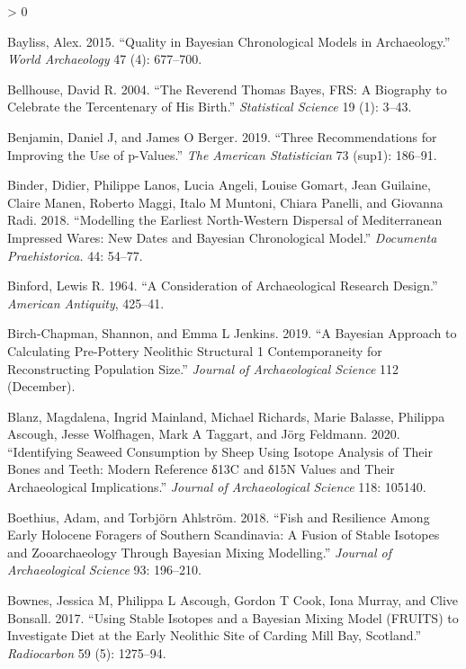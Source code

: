 \documentclass[
]{article}
\newlength{\cslhangindent}
\newenvironment{CSLReferences}[2] %
 {%
  \setlength{\parindent}{0pt}
  \ifodd #1 \everypar{\setlength{\hangindent}{\cslhangindent}}\ignorespaces\fi
  \ifnum #2 > 0
  \setlength{\parskip}{#2\baselineskip}
  \fi
 }%
 {}
\begin{document}
\begin{CSLReferences}{1}{0}
\leavevmode\hypertarget{ref-bayliss_quality_2015}{}%
Bayliss, Alex. 2015. {``Quality in {Bayesian} Chronological Models in
Archaeology.''} \emph{World Archaeology} 47 (4): 677--700.

\leavevmode\hypertarget{ref-bellhouse_reverend_2004}{}%
Bellhouse, David R. 2004. {``The {Reverend} {Thomas} {Bayes}, {FRS}: A
Biography to Celebrate the Tercentenary of His Birth.''}
\emph{Statistical Science} 19 (1): 3--43.

\leavevmode\hypertarget{ref-benjamin_three_2019}{}%
Benjamin, Daniel J, and James O Berger. 2019. {``Three Recommendations
for Improving the Use of p-Values.''} \emph{The American Statistician}
73 (sup1): 186--91.

\leavevmode\hypertarget{ref-binder_modelling_2018}{}%
Binder, Didier, Philippe Lanos, Lucia Angeli, Louise Gomart, Jean
Guilaine, Claire Manen, Roberto Maggi, Italo M Muntoni, Chiara Panelli,
and Giovanna Radi. 2018. {``Modelling the Earliest North-Western
Dispersal of {Mediterranean} {Impressed} {Wares}: New Dates and
{Bayesian} Chronological Model.''} \emph{Documenta Praehistorica.} 44:
54--77.

\leavevmode\hypertarget{ref-binford_consideration_1964}{}%
Binford, Lewis R. 1964. {``A Consideration of Archaeological Research
Design.''} \emph{American Antiquity}, 425--41.

\leavevmode\hypertarget{ref-birch-chapman_bayesian_2019}{}%
Birch-Chapman, Shannon, and Emma L Jenkins. 2019. {``A {Bayesian}
Approach to Calculating {Pre}-{Pottery} {Neolithic} Structural 1
Contemporaneity for Reconstructing Population Size.''} \emph{Journal of
Archaeological Science} 112 (December).

\leavevmode\hypertarget{ref-blanz_identifying_2020}{}%
Blanz, Magdalena, Ingrid Mainland, Michael Richards, Marie Balasse,
Philippa Ascough, Jesse Wolfhagen, Mark A Taggart, and Jörg Feldmann.
2020. {``Identifying Seaweed Consumption by Sheep Using Isotope Analysis
of Their Bones and Teeth: {Modern} Reference δ{13C} and δ{15N} Values
and Their Archaeological Implications.''} \emph{Journal of
Archaeological Science} 118: 105140.

\leavevmode\hypertarget{ref-boethius_fish_2018}{}%
Boethius, Adam, and Torbjörn Ahlström. 2018. {``Fish and Resilience
Among {Early} {Holocene} Foragers of Southern {Scandinavia}: {A} Fusion
of Stable Isotopes and Zooarchaeology Through {Bayesian} Mixing
Modelling.''} \emph{Journal of Archaeological Science} 93: 196--210.

\leavevmode\hypertarget{ref-bownes_using_2017}{}%
Bownes, Jessica M, Philippa L Ascough, Gordon T Cook, Iona Murray, and
Clive Bonsall. 2017. {``Using Stable Isotopes and a {Bayesian} Mixing
Model ({FRUITS}) to Investigate Diet at the Early {Neolithic} Site of
{Carding} {Mill} {Bay}, {Scotland}.''} \emph{Radiocarbon} 59 (5):
1275--94.


\end{CSLReferences}
\end{document}
